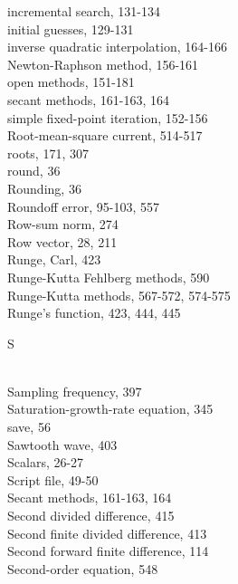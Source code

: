 \documentclass[../main.tex]{subfiles}
\begin{document}
\begin{multicols}{3}
    \hspace*{3mm}incremental search, 131-134\\
    \hspace*{3mm}initial guesses, 129-131\\
    \hspace*{3mm}inverse quadratic interpolation, 164-166\\
    \hspace*{3mm}Newton-Raphson method, 156-161\\
    \hspace*{3mm}open methods, 151-181\\
    \hspace*{3mm}secant methods, 161-163, 164\\
    \hspace*{3mm}simple fixed-point iteration, 152-156\\
    Root-mean-square current, 514-517\\
    roots, 171, 307\\
    round, 36\\
    Rounding, 36\\
    Roundoff error, 95-103, 557\\
    Row-sum norm, 274\\
    Row vector, 28, 211\\
    Runge, Carl, 423\\
    Runge-Kutta Fehlberg methods, 590\\
    Runge-Kutta methods, 567-572, 574-575\\
    Runge's function, 423, 444, 445\vspace*{2mm}\\
    \begin{huge} S \end{huge}\\
    Sampling frequency, 397\\
    Saturation-growth-rate equation, 345\\
    save, 56\\
    Sawtooth wave, 403\\
    Scalars, 26-27\\
    Script file, 49-50\\
    Secant methods, 161-163, 164\\
    Second divided difference, 415\\
    Second finite divided difference, 413\\
    Second forward finite difference, 114\\
    Second-order equation, 548\\

\end{multicols}
\end{document}
